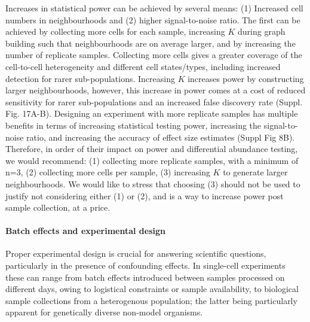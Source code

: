 \documentclass[
]{article}
\begin{document}
Increases in statistical power can be achieved by several means: (1) Increased cell numbers in neighbourhoods and (2) higher signal-to-noise ratio. The first can
be achieved by collecting more cells for each sample, increasing \(K\) during graph building such that neighbourhoods are on average larger, and by increasing the
number of replicate samples. Collecting more cells gives a greater coverage of the cell-to-cell heterogeneity and different cell states/types, including increased
detection for rarer sub-populations. Increasing \(K\) increases power by constructing larger neighbourhoods, however, this increase in power comes at a cost of
reduced sensitivity for rarer sub-populations and an increased false discovery rate (Suppl. Fig. 17A-B). Designing an experiment with more replicate samples has
multiple benefits in terms of increasing statistical testing power, increasing the signal-to-noise ratio, and increasing the accuracy of effect size estimates
(Suppl Fig 8B). Therefore, in order of their impact on power and differential abundance testing, we would recommend: (1) collecting more replicate samples, with
a minimum of n=3, (2) collecting more cells per sample, (3) increasing \(K\) to generate larger neighbourhoods. We would like to stress that choosing (3) should not
be used to justify not considering either (1) or (2), and is a way to increase power post sample collection, at a price.

\hypertarget{batch-effects-and-experimental-design}{%
\paragraph*{Batch effects and experimental design}\label{batch-effects-and-experimental-design}}

Proper experimental design is crucial for answering scientific questions, particularly in the presence of confounding effects. In single-cell experiments these
can range from batch effects introduced between samples processed on different days, owing to logistical constraints or sample availability, to biological sample
collections from a heterogenous population; the latter being particularly apparent for genetically diverse non-model organisms.
\end{document}
